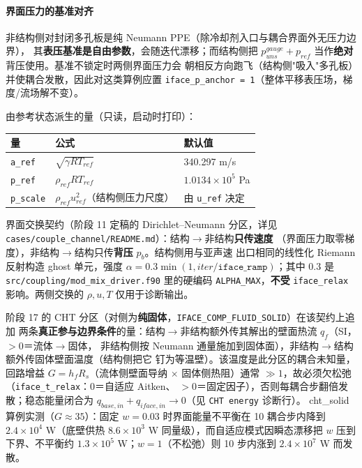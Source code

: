 \paragraph{界面压力的基准对齐}
非结构侧对封闭多孔板是纯 Neumann PPE（除冷却剂入口与耦合界面外无压力边界），
其\textbf{表压基准是自由参数}，会随迭代漂移；而结构侧把
$p_{uns}^{gauge}+p_{ref}$ 当作\textbf{绝对}背压使用。基准不锁定时两侧界面压力会
朝相反方向跑飞（结构侧"吸入"多孔板）并使耦合发散，因此对这类算例应置
\texttt{iface\_p\_anchor = 1}（整体平移表压场，梯度/流场解不变）。

由参考状态派生的量（只读，启动时打印）：

\begin{center}\small
\begin{tabular}{@{}lll@{}}
\toprule
量 & 公式 & 默认值 \\
\midrule
\texttt{a\_ref}   & $\sqrt{\gamma R T_{ref}}$              & 340.297 m/s \\
\texttt{p\_ref}   & $\rho_{ref} R T_{ref}$                 & $1.0134\times10^{5}$ Pa \\
\texttt{p\_scale} & $\rho_{ref} u_{ref}^2$（结构侧压力尺度）  & 由 \texttt{u\_ref} 决定 \\
\bottomrule
\end{tabular}
\end{center}

界面交换契约（阶段 11 定稿的 Dirichlet--Neumann 分区，详见
\texttt{cases/couple\_channel/README.md}）：结构$\to$非结构\textbf{只传速度}
（界面压力取零梯度），非结构$\to$结构只传\textbf{背压} $p_b$。结构侧用与亚声速
出口相同的线性化 Riemann 反射构造 ghost 单元，强度
$\alpha = 0.3\min(1, iter/\texttt{iface\_ramp})$；其中 $0.3$ 是
\texttt{src/coupling/mod\_mix\_driver.f90} 里的硬编码 \texttt{ALPHA\_MAX}，\textbf{不受}
\texttt{iface\_relax} 影响。两侧交换的 $\rho,u,T$ 仅用于诊断输出。

阶段 17 的 CHT 分区（对侧为\textbf{纯固体}，\texttt{IFACE\_COMP\_FLUID\_SOLID}）在该契约上追加
两条\textbf{真正参与边界条件}的量：结构$\to$非结构额外传其解出的壁面热流 $q_f$（SI，$>0$＝流体$\to$固体，
非结构侧按 Neumann 通量施加到固体面），非结构$\to$结构额外传固体壁面温度（结构侧把它
钉为等温壁）。该温度是此分区的耦合未知量，回路增益 $G=h_fR_s$（流体侧壁面导纳 $\times$
固体侧热阻）通常 $\gg1$，故必须欠松弛（\texttt{iface\_t\_relax}：$0$＝自适应 Aitken、
$>0$＝固定因子），否则每耦合步翻倍发散；稳态能量闭合为
$q_{base,in}+q_{iface,in}\to0$（见 \texttt{CHT energy} 诊断行）。
cht\_solid 算例实测（$G\approx35$）：固定 $w=0.03$ 时界面能量不平衡在 10 耦合步内降到
$2.4\times10^4$ W（底壁供热 $8.6\times10^3$ W 同量级），而自适应模式因瞬态漂移把 $w$ 压到
下界、不平衡约 $1.3\times10^5$ W；$w=1$（不松弛）则 10 步内涨到 $2.4\times10^7$ W 而发散。

